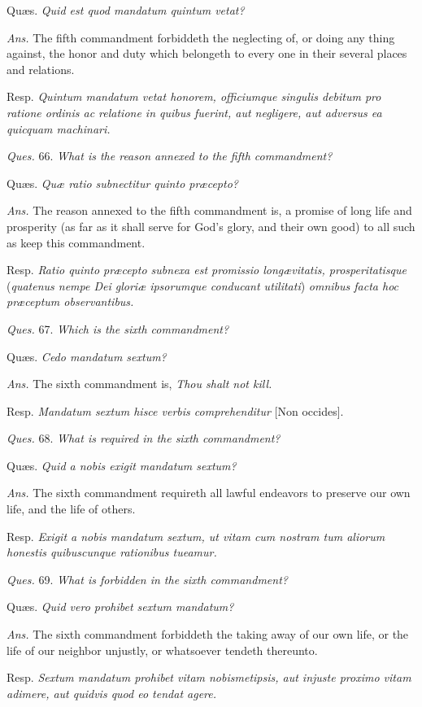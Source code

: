 Quæs. \emph{Quid est quod mandatum quintum vetat?}

\emph{Ans.} The fifth commandment forbiddeth the neglecting of, or doing any thing against, the honor and duty which belongeth to every one in their several places and relations.

Resp. \emph{Quintum mandatum vetat honorem, officiumque singulis debitum pro ratione ordinis ac relatione in quibus fuerint, aut negligere, aut adversus ea quicquam machinari.}

\emph{Ques.} 66. \emph{What is the reason annexed to the fifth commandment?}

Quæs. \emph{Quæ ratio subnectitur quinto præcepto?}

\emph{Ans.} The reason annexed to the fifth commandment is, a promise of long life and prosperity (as far as it shall serve for God's glory, and their own good) to all such as keep this commandment.

Resp. \emph{Ratio quinto præcepto subnexa est promissio longævitatis, prosperitatisque} (\emph{quatenus nempe Dei gloriæ ipsorumque conducant utilitati}) \emph{omnibus facta hoc præceptum observantibus.}

\emph{Ques.} 67. \emph{Which is the sixth commandment?}

Quæs. \emph{Cedo mandatum sextum?}

\emph{Ans.} The sixth commandment is, \emph{Thou shalt not kill.}

Resp. \emph{Mandatum sextum hisce verbis comprehenditur} [Non occides].

\emph{Ques.} 68. \emph{What is required in the sixth commandment?}

Quæs. \emph{Quid a nobis exigit mandatum sextum?}

\emph{Ans.} The sixth commandment requireth all lawful endeavors to preserve our own life, and the life of others.

Resp. \emph{Exigit a nobis mandatum sextum, ut vitam cum nostram tum aliorum honestis quibuscunque rationibus tueamur.}

\emph{Ques.} 69. \emph{What is forbidden in the sixth commandment?}

Quæs. \emph{Quid vero prohibet sextum mandatum?}

\emph{Ans.} The sixth commandment forbiddeth the taking away of our own life, or the life of our neighbor unjustly, or whatsoever tendeth thereunto.

Resp. \emph{Sextum mandatum prohibet vitam nobismetipsis, aut injuste proximo vitam adimere, aut quidvis quod eo tendat agere.}

